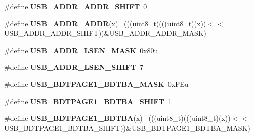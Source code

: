 \begin{DoxyCompactItemize}
\item 
\hypertarget{group___u_s_b___register___masks_ga57c7c394504da946dae75d5b20a2f297}{}\#define {\bfseries U\+S\+B\+\_\+\+A\+D\+D\+R\+\_\+\+A\+D\+D\+R\+\_\+\+S\+H\+I\+F\+T}~0\label{group___u_s_b___register___masks_ga57c7c394504da946dae75d5b20a2f297}

\item 
\hypertarget{group___u_s_b___register___masks_ga9516a2f10616a785a9dab6f55a8e1e34}{}\#define {\bfseries U\+S\+B\+\_\+\+A\+D\+D\+R\+\_\+\+A\+D\+D\+R}(x)                                              ~(((uint8\+\_\+t)(((uint8\+\_\+t)(x))$<$$<$U\+S\+B\+\_\+\+A\+D\+D\+R\+\_\+\+A\+D\+D\+R\+\_\+\+S\+H\+I\+F\+T))\&U\+S\+B\+\_\+\+A\+D\+D\+R\+\_\+\+A\+D\+D\+R\+\_\+\+M\+A\+S\+K)\label{group___u_s_b___register___masks_ga9516a2f10616a785a9dab6f55a8e1e34}

\item 
\hypertarget{group___u_s_b___register___masks_ga695e1ebe159d45ecd94fe40627ac121e}{}\#define {\bfseries U\+S\+B\+\_\+\+A\+D\+D\+R\+\_\+\+L\+S\+E\+N\+\_\+\+M\+A\+S\+K}~0x80u\label{group___u_s_b___register___masks_ga695e1ebe159d45ecd94fe40627ac121e}

\item 
\hypertarget{group___u_s_b___register___masks_ga7c81adb1ac1c658006ea0ebfd4644634}{}\#define {\bfseries U\+S\+B\+\_\+\+A\+D\+D\+R\+\_\+\+L\+S\+E\+N\+\_\+\+S\+H\+I\+F\+T}~7\label{group___u_s_b___register___masks_ga7c81adb1ac1c658006ea0ebfd4644634}

\item 
\hypertarget{group___u_s_b___register___masks_gacd2b27fefcff6f79e930e76d2a1a7b26}{}\#define {\bfseries U\+S\+B\+\_\+\+B\+D\+T\+P\+A\+G\+E1\+\_\+\+B\+D\+T\+B\+A\+\_\+\+M\+A\+S\+K}~0x\+F\+Eu\label{group___u_s_b___register___masks_gacd2b27fefcff6f79e930e76d2a1a7b26}

\item 
\hypertarget{group___u_s_b___register___masks_ga50c84ff08884c9825cf6c513f11aabe4}{}\#define {\bfseries U\+S\+B\+\_\+\+B\+D\+T\+P\+A\+G\+E1\+\_\+\+B\+D\+T\+B\+A\+\_\+\+S\+H\+I\+F\+T}~1\label{group___u_s_b___register___masks_ga50c84ff08884c9825cf6c513f11aabe4}

\item 
\hypertarget{group___u_s_b___register___masks_ga4c24d2700854ca26779e3343dc7058da}{}\#define {\bfseries U\+S\+B\+\_\+\+B\+D\+T\+P\+A\+G\+E1\+\_\+\+B\+D\+T\+B\+A}(x)                                    ~(((uint8\+\_\+t)(((uint8\+\_\+t)(x))$<$$<$U\+S\+B\+\_\+\+B\+D\+T\+P\+A\+G\+E1\+\_\+\+B\+D\+T\+B\+A\+\_\+\+S\+H\+I\+F\+T))\&U\+S\+B\+\_\+\+B\+D\+T\+P\+A\+G\+E1\+\_\+\+B\+D\+T\+B\+A\+\_\+\+M\+A\+S\+K)\label{group___u_s_b___register___masks_ga4c24d2700854ca26779e3343dc7058da}


\end{DoxyCompactItemize}
